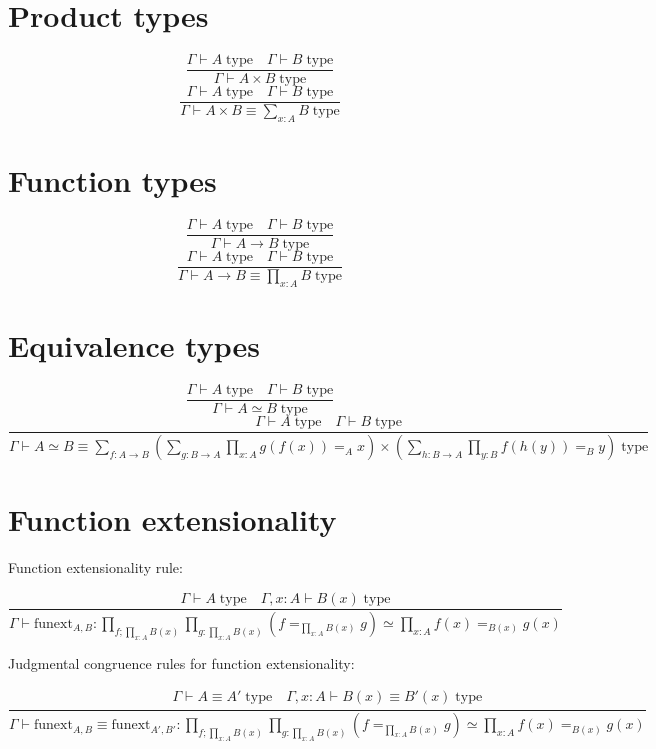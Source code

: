\documentclass{book}
\begin{document}
\section{Product types}
$$\frac{\Gamma \vdash A \; \mathrm{type} \quad \Gamma \vdash B \; \mathrm{type}}{\Gamma \vdash A \times B \; \mathrm{type}}$$
$$\frac{\Gamma \vdash A \; \mathrm{type} \quad \Gamma \vdash B \; \mathrm{type}}{\Gamma \vdash A \times B \equiv \sum_{x:A} B \; \mathrm{type}}$$

\section{Function types}
$$\frac{\Gamma \vdash A \; \mathrm{type} \quad \Gamma \vdash B \; \mathrm{type}}{\Gamma \vdash A \to B \; \mathrm{type}}$$
$$\frac{\Gamma \vdash A \; \mathrm{type} \quad \Gamma \vdash B \; \mathrm{type}}{\Gamma \vdash A \to B \equiv \prod_{x:A} B \; \mathrm{type}}$$

\section{Equivalence types}

$$\frac{\Gamma \vdash A \; \mathrm{type} \quad \Gamma \vdash B \; \mathrm{type}}{\Gamma \vdash A \simeq B \; \mathrm{type}}$$ 
$$\frac{\Gamma \vdash A \; \mathrm{type} \quad \Gamma \vdash B \; \mathrm{type}}{\Gamma \vdash A \simeq B \equiv \sum_{f:A \to B} \left(\sum_{g:B \to A} \prod_{x:A} g(f(x)) =_A x\right) \times \left(\sum_{h:B \to A} \prod_{y:B} f(h(y)) =_B y\right) \; \mathrm{type}}$$

\section{Function extensionality}

Function extensionality rule:

$$\frac{\Gamma \vdash A \; \mathrm{type} \quad \Gamma, x:A \vdash B(x) \; \mathrm{type}}{\Gamma \vdash \mathrm{funext}_{A, B}:\prod_{f;\prod_{x:A} B(x)} \prod_{g:\prod_{x:A} B(x)} (f =_{\prod_{x:A} B(x)} g) \simeq \prod_{x:A} f(x) =_{B(x)} g(x)}$$

Judgmental congruence rules for function extensionality:

$$\frac{
\begin{array}{c}
	\Gamma \vdash A \equiv A' \; \mathrm{type} \quad \Gamma, x:A \vdash B(x) \equiv B'(x) \; \mathrm{type}
\end{array}
}{\Gamma \vdash \mathrm{funext}_{A, B} \equiv \mathrm{funext}_{A', B'}:\prod_{f;\prod_{x:A} B(x)} \prod_{g:\prod_{x:A} B(x)} (f =_{\prod_{x:A} B(x)} g) \simeq \prod_{x:A} f(x) =_{B(x)} g(x)}$$
\end{document}
